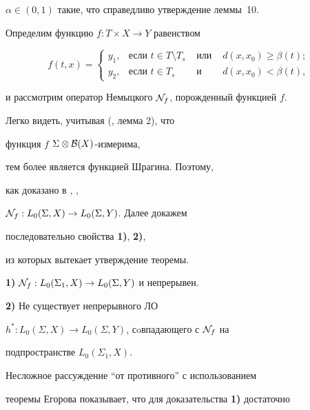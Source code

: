 $\alpha\in(0,1)$ такие, что справедливо утверждение леммы~10.


Определим функцию $f:T\times X\to Y$ равенством


\begin{equation}


\label{10}


f(t,x)=\left\{ \begin{array}{rlcl}


y_1, & \text{если } t\in T\setminus T_s & \text{ или } &


d(x,x_0)\ge\beta(t);\\


y_2, & \text{если } t\in T_s & \text{ и } & d(x,x_0)<\beta(t),


\end{array} \right.


\end{equation}


и рассмотрим оператор Немыцкого ${\cal N}_f$, порожденный функцией $f$.





Легко видеть, учитывая (\cite{78}, лемма 2), что


функция $f$\; $\Sigma\otimes{\cal B}(X)$-из\-ме\-ри\-ма,


тем более является функцией Шрагина. Поэтому,


как доказано в \cite{32}, \cite{55},


${\cal N}_f:L_0(\Sigma,X)\to L_0(\Sigma,Y)$. Далее докажем


последовательно свойства {\bf 1)}, {\bf 2)},


из которых вытекает утверждение теоремы.





{\bf 1)} ${\cal N}_f:L_0(\Sigma_1,X)\to L_0(\Sigma,Y)$ и непрерывен.





{\bf 2)} Не существует непрерывного ЛО


$h^\ast:L_0(\Sigma,X)\to L_0(\Sigma,Y)$, сoвпадающего с ${\cal N}_f$ на


подпространстве $L_0(\Sigma_1,X)$.





Несложное рассуждение ``от про\-тив\-но\-го'' с использованием


теоремы Егорова показывает, что для доказательства {\bf 1)} достаточно


